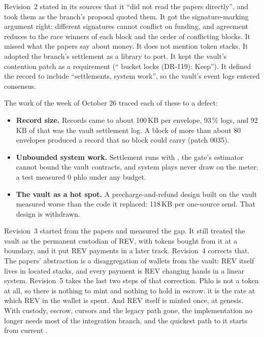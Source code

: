 \documentclass[11pt]{article}
\newcommand{\code}{\path}
\begin{document}
Revision~2 stated in its sources that it ``did not read the papers directly'', and took them as the branch's proposal quoted them. It got the signature-marking argument right: different signatures cannot conflict on funding, and agreement reduces to the race winners of each block and the order of conflicting blocks. It missed what the papers say about money. It does not mention token stacks. It adopted the branch's settlement as a library to port. It kept the vault's contention patch as a requirement (``\code{SystemVault.rho} bucket locks (DR-119): Keep''). It defined the record to include ``settlements, system work'', so the vault's event logs entered consensus.

The work of the week of October 26 traced each of these to a defect:
\begin{itemize}
\item \textbf{Record size.} Records came to about 100\,KB per envelope, 93\,\% logs, and 92\,KB of that was the vault settlement log. A block of more than about 80 envelopes produced a record that no block could carry (patch 0035).
\item \textbf{Unbounded system work.} Settlement runs with \code{Cost::unsafe_max()}, the gate's estimator cannot bound the vault contracts, and system plays never draw on the meter: a test measured 0 phlo under any budget.
\item \textbf{The vault as a hot spot.} A precharge-and-refund design built on the vault measured worse than the code it replaced: 118\,KB per one-source send. That design is withdrawn.
\end{itemize}

Revision~3 started from the papers and measured the gap. It still treated the vault as the permanent custodian of REV, with tokens bought from it at a boundary, and it put REV payments in a later track. Revision~4 corrects that. The papers' abstraction is a disaggregation of wallets from the vault: REV itself lives in located stacks, and every payment is REV changing hands in a linear system. Revision~5 takes the last two steps of that correction. Phlo is not a token at all, so there is nothing to mint and nothing to hold in escrow: it is the rate at which REV in the wallet is spent. And REV itself is minted once, at genesis. With custody, escrow, cursors and the legacy path gone, the implementation no longer needs most of the integration branch, and the quickest path to it starts from current \code{dev}.
\end{document}
